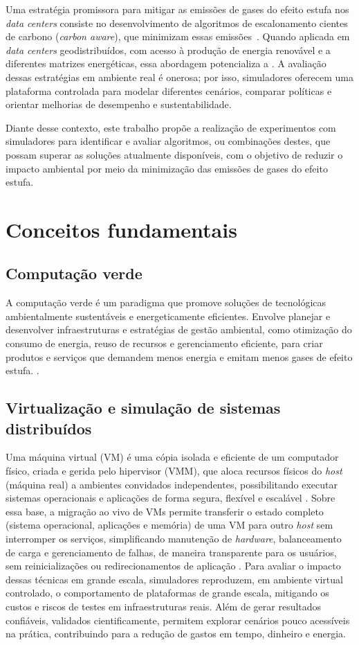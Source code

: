 \documentclass[12pt]{article}
\begin{document}
Uma estratégia promissora para mitigar as emissões de gases do efeito estufa nos \textit{data centers} consiste no desenvolvimento de algoritmos de escalonamento cientes de carbono (\textit{carbon aware}), que minimizam essas emissões~\cite{vasconcelos2023optimal}. Quando aplicada em \textit{data centers} geodistribuídos, com acesso à produção de energia renovável e a diferentes matrizes energéticas, essa abordagem potencializa a   . A avaliação dessas estratégias em ambiente real é onerosa; por isso, simuladores oferecem uma plataforma controlada para modelar diferentes cenários, comparar políticas e orientar melhorias de desempenho e sustentabilidade.

Diante desse contexto, este trabalho propõe a realização de experimentos com simuladores para identificar e avaliar algoritmos, ou combinações destes, que possam superar as soluções atualmente disponíveis, com o objetivo de reduzir o impacto ambiental por meio da minimização das emissões de gases do efeito estufa.

\section{Conceitos fundamentais}
\subsection{Computação verde}
A computação verde é um paradigma que promove soluções de tecnológicas ambientalmente sustentáveis e energeticamente eficientes. Envolve planejar e desenvolver infraestruturas e estratégias de gestão ambiental, como otimização do consumo de energia, reuso de recursos e gerenciamento eficiente, para criar produtos e serviços que demandem menos energia e emitam menos gases de efeito estufa. \cite{paul:2018}.

\subsection{Virtualização e simulação de sistemas distribuídos}
Uma máquina virtual (VM) é uma cópia isolada e eficiente de um computador físico, criada e gerida pelo hipervisor (VMM), que aloca recursos físicos do \textit{host} (máquina real) a ambientes convidados independentes, possibilitando executar sistemas operacionais e aplicações de forma segura, flexível e escalável \cite{popek:74,buyya:13}. Sobre essa base, a migração ao vivo de VMs permite transferir o estado completo (sistema operacional, aplicações e memória) de uma VM para outro \textit{host} sem interromper os serviços, simplificando manutenção de \textit{hardware}, balanceamento de carga e gerenciamento de falhas, de maneira transparente para os usuários, sem reinicializações ou redirecionamentos de aplicação \cite{clark:2005}. Para avaliar o impacto dessas técnicas em grande escala, simuladores reproduzem, em ambiente virtual controlado, o comportamento de plataformas de grande escala, mitigando os custos e riscos de testes em infraestruturas reais. Além de gerar resultados confiáveis, validados cientificamente, permitem explorar cenários pouco acessíveis na prática, contribuindo para a redução de gastos em tempo, dinheiro e energia.
\end{document}
